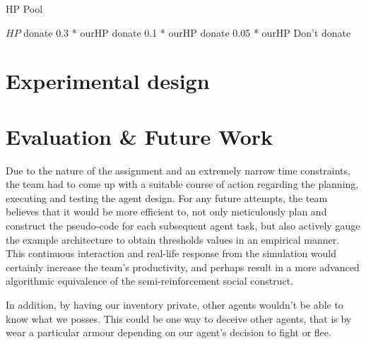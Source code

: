 \begin{algorithm}
\caption{HP Pool}
\begin{algorithmic} 
\Require $HP$
\State donate 0.3 * ourHP
\Else
{} 
\State donate 0.1 * ourHP
\Else 
{}
\State donate 0.05 * ourHP
\Else
\State Don't donate
\EndIf
\EndIf
\EndIf

\end{algorithmic}
\end{algorithm}

\section{Experimental design}

\section{Evaluation \& Future Work}

Due to the nature of the assignment and an extremely narrow time constraints, the team had to come up with a suitable course of action regarding the planning, executing and testing the agent design. For any future attempts, the team believes that it would be more efficient to, not only meticulously plan and construct the pseudo-code for each subsequent agent task, but also actively gauge the example architecture to obtain thresholds values in an empirical manner. This continuous interaction and real-life response from the simulation would certainly increase the team's productivity, and perhaps result in a more advanced algorithmic equivalence of the semi-reinforcement social construct.

In addition, by having our inventory private, other agents wouldn't be able to know what we posses. This could be one way to deceive other agents, that is by wear a particular armour depending on our agent's decision to fight or flee. 